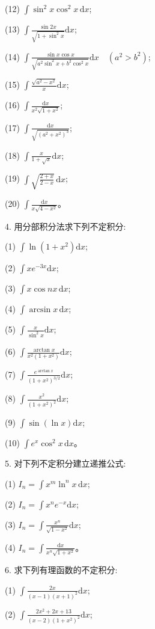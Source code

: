 \documentclass[UTF8,12pt,a4paper,fontset=fandol]{ctexart}
\begin{document}
(12) $\displaystyle \int\sin^2x\cos^2x\,\mathrm dx$;

(13) $\displaystyle \int\frac{\sin2x}{\sqrt{1+\sin^2x}}\mathrm dx$;

(14) $\displaystyle \int\frac{\sin x\cos x}{\sqrt{a^2\sin^2x+b^2\cos^2x}}\mathrm dx\quad(a^2>b^2)$;

(15) $\displaystyle \int\frac{\sqrt{a^2-x^2}}x\mathrm dx$;

(16) $\displaystyle \int\frac{\mathrm dx}{x^2\sqrt{1+x^2}}$;

(17) $\displaystyle \int\frac{\mathrm dx}{\sqrt{(a^2+x^2)^3}}$;

(18) $\displaystyle \int\frac{x}{1+\sqrt x}\mathrm dx$;

(19) $\displaystyle \int\sqrt{\frac{2+x}{2-x}}\,\mathrm dx$;

(20) $\displaystyle \int\frac{\mathrm dx}{x\sqrt{4-x^2}}$。

4. 用分部积分法求下列不定积分:

(1) $\displaystyle \int\ln(1+x^2)\mathrm dx$;

(2) $\displaystyle \int xe^{-3x}\mathrm dx$;

(3) $\displaystyle \int x\cos nx\,\mathrm dx$;

(4) $\displaystyle \int\arcsin x\,\mathrm dx$;

(5) $\displaystyle \int\frac{x}{\sin^2x}\mathrm dx$;

(6) $\displaystyle \int\frac{\arctan x}{x^2(1+x^2)}\mathrm dx$;

(7) $\displaystyle \int\frac{e^{\arctan x}}{(1+x^2)^{3/2}}\mathrm dx$;

(8) $\displaystyle \int\frac{x^2}{(1+x^2)^2}\mathrm dx$;

(9) $\displaystyle \int\sin(\ln x)\mathrm dx$;

(10) $\displaystyle \int e^x\cos^2x\,\mathrm dx$。

5. 对下列不定积分建立递推公式:

(1) $\displaystyle I_n=\int x^m\ln^nx\,\mathrm dx$;

(2) $\displaystyle I_n=\int x^ne^{-x}\mathrm dx$;

(3) $\displaystyle I_n=\int\frac{x^n}{\sqrt{1-x^2}}\mathrm dx$;

(4) $\displaystyle I_n=\int\frac{\mathrm dx}{x^n\sqrt{1+x^2}}$。

6. 求下列有理函数的不定积分:

(1) $\displaystyle \int\frac{2x}{(x-1)(x+1)^2}\mathrm dx$;

(2) $\displaystyle \int\frac{2x^2+2x+13}{(x-2)(1+x^2)^2}\mathrm dx$;
\end{document}
